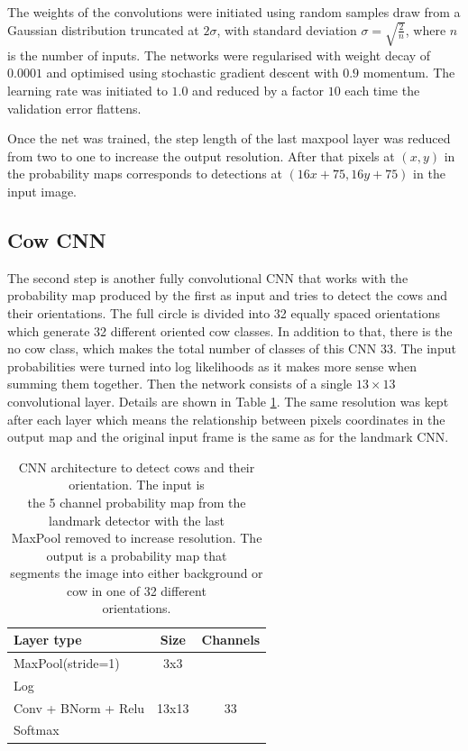 \documentclass{cta-author}
\begin{document}
The weights of the convolutions were initiated using random samples draw from a Gaussian
distribution truncated at $2\sigma$, with standard deviation $\sigma=\sqrt{\frac{2}{n}}$,
where $n$ is the number of inputs\cite{DBLP:journals/corr/HeZR015}. The networks were regularised with weight decay of
$0.0001$ and optimised using stochastic gradient descent with $0.9$ momentum. The
learning rate was initiated to $1.0$ and reduced by a factor $10$ each time the validation
error flattens. 

Once the net was trained, the step length of the last maxpool layer was reduced from two to one to increase the output resolution. After that pixels at $\left(x, y\right)$ in the probability maps corresponds to detections at $\left(16 x + 75, 16 y + 75\right)$ in the input image.

\subsection{Cow CNN}

The second step is another fully convolutional CNN that works with the probability map produced by the first as input and tries to detect the cows and their orientations. The full circle is divided into 32 equally spaced orientations which generate 32 different oriented cow classes. In addition to that, there is the no cow class, which makes the total number of classes of this CNN 33. The input probabilities were turned into log likelihoods as it makes more sense when summing them together. Then the network consists of a single $ 13 \times 13 $ convolutional layer. Details are shown in Table \ref{tab:cowdirnet}. The same resolution was kept after each layer which means the relationship between pixels coordinates in the output map and the original input frame is the same as for the landmark CNN.

\begin{table}
\begin{center}
\begin{tabular}{|l|c|c|}
\hline
\textbf{Layer type} & \textbf{Size} & \textbf{Channels} \\
\hline

MaxPool(stride=1) & 3x3 &  \\
Log & & \\
Conv + BNorm + Relu & 13x13 & 33 \\
Softmax & & \\
\hline
\end{tabular}
\end{center}
\caption{CNN architecture to detect
cows and their orientation. The input is \\
the 5 channel probability map from the landmark detector with the last \\
MaxPool removed to increase resolution. The output is a probability map that \\
segments the image into either background or cow in one of 32 different \\
orientations.
}
\label{tab:cowdirnet}
\end{table}
\end{document}

